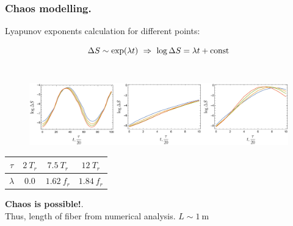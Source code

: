 \begin{frame}
  \frametitle{Chaos modelling.}
  Lyapunov exponents calculation for different points:
  
  $$\Delta S \sim \exp(\lambda t) \ \Rightarrow \ \log \Delta S = \lambda t + \const$$\\[5pt]
  
  \begin{figure}[h]
    \includegraphics[width=1.0\textwidth]{figures/lyapunovs.pdf}
  \end{figure}
  
  \begin{center}
      \begin{tabular}{c|c|c|c}
        $\tau$ & $2 \ T_r$ & $7.5 \ T_r$ & $12 \ T_r$ \\ \hline
        $\lambda$ & $0.0$ & $1.62 \ f_r$ & $1.84 \ f_r$
      \end{tabular}
  \end{center}
    
  \phantom{42}
  
  \textbf{Chaos is possible!}. \\
  Thus, length of fiber from numerical analysis. $L \sim 1 \ \text{m}$
  
\end{frame}